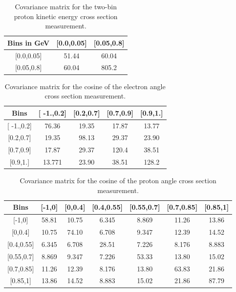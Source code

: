 \documentclass[amsmath,amssymb,aps,prd,showpacs,twocolumn,superscriptaddress,letterpaper,longbibliography, floatfix]{revtex4-2}
\begin{document}
\FloatBarrier
\begin{table}[H]
\caption{Covariance matrix for the two-bin proton kinetic energy cross section measurement.} \label{tbl:CovPe2}
\begin{center} \begin{tabular}{|c|c|c|}
\hline
Bins in GeV & [0.0,0.05] & [0.05,0.8]\\ \hline
{[0.0,0.05]} & 51.44& 60.04		\\
{[0.05,0.8]}  &60.04& 805.2   \\
\hline
\end{tabular} \end{center}
\end{table}
\FloatBarrier
\begin{table}[H]
\caption{Covariance matrix for the cosine of the electron angle cross section measurement.} \label{tbl:CovEA}
\begin{center} \begin{tabular}{|c|c|c|c|c|}
\hline
Bins & [ -1.,0.2] & [0.2,0.7]& [0.7,0.9]& [0.9,1.]\\\hline
{[ -1.,0.2]} &  76.36& 19.35& 17.87&13.77 		\\
{[0.2,0.7]}  &19.35& 98.13& 29.37 &23.90    \\
{[0.7,0.9]}  &17.87& 29.37& 120.4& 38.51    \\
{[0.9,1.]}  &13.771 &23.90& 38.51& 128.2  \\
\hline
\end{tabular} \end{center}
\end{table}
\FloatBarrier
\begin{table}[H]
\caption{Covariance matrix for the cosine of the proton angle cross section measurement.} \label{tbl:CovPA}
\begin{center} \begin{tabular}{|c|c|c|c|c|c|c|}
\hline
Bins & [-1,0] & [0,0.4]& [0.4,0.55]& [0.55,0.7]& [0.7,0.85]& [0.85,1]\\\hline
{[-1,0]} &  58.81& 10.75& 6.345& 8.869& 11.26& 13.86 	\\
{[0,0.4]}  &10.75& 74.10& 6.708& 9.347& 12.39& 14.52 \\
{[0.4,0.55]}  &6.345& 6.708& 28.51& 7.226& 8.176& 8.883 \\
{[0.55,0.7]}  &8.869& 9.347& 7.226& 53.33& 13.80& 15.02 \\
{[0.7,0.85]}  &11.26& 12.39& 8.176& 13.80& 63.83& 21.86 \\
{[0.85,1]}  &13.86& 14.52& 8.883& 15.02& 21.86& 87.79\\
\hline
\end{tabular} \end{center}
\end{table}
\end{document}
